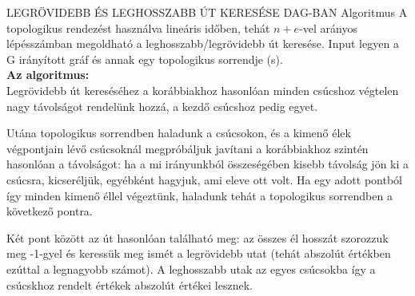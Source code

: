 \begin{tetel}{LEGRÖVIDEBB ÉS LEGHOSSZABB ÚT KERESÉSE DAG-BAN Algoritmus}
A topologikus rendezést használva lineáris időben, tehát $n+e$-vel arányos lépésszámban megoldható a leghosszabb/legrövidebb út keresése.
Input legyen a G irányított gráf és annak egy topologikus sorrendje (s).
\\
\textbf{Az algoritmus:}\\
Legrövidebb út kereséséhez a korábbiakhoz hasonlóan minden csúcshoz végtelen nagy távolságot rendelünk hozzá, a kezdő csúcshoz pedig egyet.

Utána topologikus sorrendben haladunk a csúcsokon, és a kimenő élek végpontjain lévő csúcsoknál megpróbáljuk javítani a korábbiakhoz szintén hasonlóan a távolságot: ha a mi irányunkból összeségében kisebb távolság jön ki a csúcsra, kicseréljük, egyébként hagyjuk, ami eleve ott volt. Ha egy adott pontból így minden kimenő éllel végeztünk, haladunk tehát a topologikus sorrendben a következő pontra.

Két pont között az út hasonlóan található meg: az összes él hosszát szorozzuk meg -1-gyel és keressük meg ismét a legrövidebb utat (tehát abszolút értékben ezúttal a legnagyobb számot). A leghosszabb utak az egyes csúcsokba így a csúcskhoz rendelt értékek abszolút értékei lesznek.
\end{tetel}
